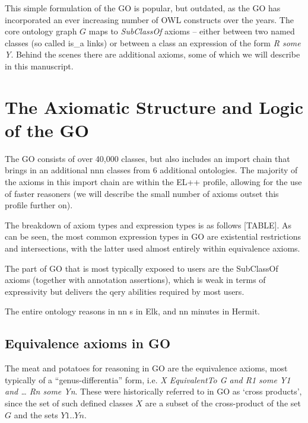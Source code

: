 \documentclass{llncs}
\begin{document}
This simple formulation of the GO is popular, but outdated, as the GO
has incorporated an ever increasing number of OWL constructs over the
years. The core ontology graph $G$ maps to \emph{SubClassOf} axioms --
either between two named classes (so called is\_a links) or between a
class an expression of the form \emph{R some Y}. Behind the scenes
there are additional axioms, some of which we will describe in this
manuscript.

\section{The Axiomatic Structure and Logic of the GO}

The GO consists of over 40,000 classes, but also includes an import
chain that brings in an additional nnn classes from 6 additional
ontologies. The majority of the axioms in this import chain are within
the EL++ profile, allowing for the use of faster reasoners (we will
describe the small number of axioms outset this profile further on).

The breakdown of axiom types and expression types is as follows
[TABLE]. As can be seen, the most common expression types in GO are
existential restrictions and intersections, with the latter used
almost entirely within equivalence axioms.

The part of GO that is most typically exposed to users are the
SubClassOf axioms (together with annotation assertions), which is weak
in terms of expressivity but delivers the qery abilities required by
most users.

The entire ontology reasons in nn s in Elk\cite{kazakov2012elk}, and nn
minutes in Hermit.

\subsection{Equivalence axioms in GO}

The meat and potatoes for reasoning in GO are the equivalence axioms,
most typically of a ``genus-differentia'' form, i.e. \emph{X
  EquivalentTo G and R1 some Y1 and … Rn some Yn}. These were
historically referred to in GO as ‘cross
products’\cite{Mungall2010GOXP}, since the set of such defined classes
$X$ are a subset of the cross-product of the set $G$ and the sets
$Y1..Yn$.
\end{document}
